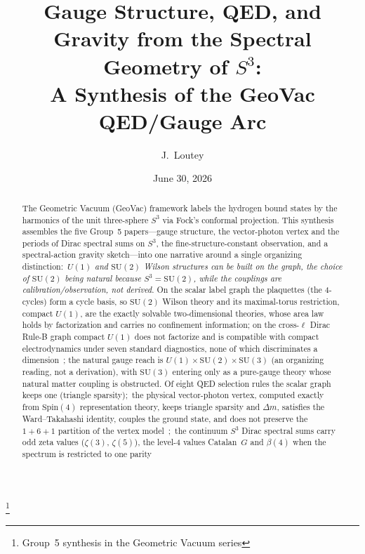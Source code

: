 \documentclass[aps,pra,twocolumn,superscriptaddress,longbibliography]{revtex4-2}
\begin{document}
\title{Gauge Structure, QED, and Gravity from the Spectral Geometry of
$S^3$:\\ A Synthesis of the GeoVac QED/Gauge Arc}
\thanks{Group~5 synthesis in the Geometric Vacuum series}

\author{J.~Loutey}

\date{June 30, 2026}


\begin{abstract}
The Geometric Vacuum (GeoVac) framework labels the hydrogen bound
states by the harmonics of the unit three-sphere $S^3$ via Fock's
conformal projection.  This synthesis assembles the five Group~5
papers---gauge structure, the vector-photon vertex and the periods of
Dirac spectral sums on $S^3$,
the fine-structure-constant observation,
and a spectral-action gravity sketch---into one narrative around a single
organizing distinction:\ \emph{$U(1)$ and $\mathrm{SU}(2)$ Wilson
structures can be built on the graph, the choice of $\mathrm{SU}(2)$ being
natural because $S^3 = \mathrm{SU}(2)$, while the couplings are
calibration/observation, not derived}.  On the scalar label graph the
plaquettes (the 4-cycles) form a cycle basis, so $\mathrm{SU}(2)$ Wilson
theory and its maximal-torus restriction, compact $U(1)$, are the exactly
solvable two-dimensional theories, whose area law holds by factorization
and carries no confinement information; on the cross-$\ell$ Dirac Rule-B
graph compact $U(1)$ does not factorize and is compatible with compact
electrodynamics under seven standard diagnostics, none of which
discriminates a dimension~\cite{loutey_paper30}; the natural gauge reach is
$U(1)\times\mathrm{SU}(2)\times\mathrm{SU}(3)$ (an organizing reading,
not a derivation), with $\mathrm{SU}(3)$
entering only as a pure-gauge theory whose natural matter coupling is
obstructed.  Of eight QED selection rules the scalar graph keeps one
(triangle sparsity);\ the physical vector-photon vertex, computed exactly
from $\mathrm{Spin}(4)$ representation theory, keeps triangle sparsity
and $\Delta m$, satisfies the Ward--Takahashi identity, couples the
ground state, and does not preserve the $1{+}6{+}1$ partition of the
vertex model~\cite{loutey_paper33};\ the continuum $S^3$ Dirac spectral
sums carry odd zeta values ($\zeta(3)$, $\zeta(5)$), the level-4 values
Catalan~$G$ and $\beta(4)$ when the spectrum is restricted to one parity

\end{abstract}
\end{document}
